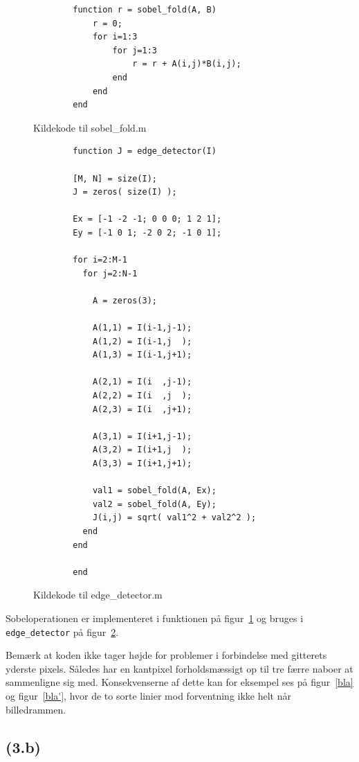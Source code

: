 \documentclass{article}
\begin{document}
\begin{figure}
	\begin{verbatim}
		function r = sobel_fold(A, B)
		    r = 0;
		    for i=1:3
		        for j=1:3
		            r = r + A(i,j)*B(i,j);
		        end
		    end
		end
	\end{verbatim}
	\caption{Kildekode til sobel\_fold.m}
	\label{sobelfold}
\end{figure}

\begin{figure}
	\begin{verbatim}
		function J = edge_detector(I)

		[M, N] = size(I);
		J = zeros( size(I) );

		Ex = [-1 -2 -1; 0 0 0; 1 2 1];
		Ey = [-1 0 1; -2 0 2; -1 0 1];

		for i=2:M-1
		  for j=2:N-1

		    A = zeros(3);

		    A(1,1) = I(i-1,j-1);
		    A(1,2) = I(i-1,j  );
		    A(1,3) = I(i-1,j+1);

		    A(2,1) = I(i  ,j-1);
		    A(2,2) = I(i  ,j  );
		    A(2,3) = I(i  ,j+1);

		    A(3,1) = I(i+1,j-1);
		    A(3,2) = I(i+1,j  );
		    A(3,3) = I(i+1,j+1);

		    val1 = sobel_fold(A, Ex);
		    val2 = sobel_fold(A, Ey);
		    J(i,j) = sqrt( val1^2 + val2^2 );
		  end
		end

		end
	\end{verbatim}
	\caption{Kildekode til edge\_detector.m}
	\label{edgedetector}
\end{figure}

Sobeloperationen er implementeret i funktionen på figur~\ref{sobelfold} og bruges i {\tt edge\_detector} på figur~\ref{edgedetector}.

Bemærk at koden ikke tager højde for problemer i forbindelse med gitterets yderste pixels. Således har en kantpixel forholdsmæssigt op til tre færre naboer at sammenligne sig med. Konsekvenserne af dette kan for eksempel ses på figur~\ref{bla} og figur~\ref{bla'}, hvor de to sorte linier mod forventning ikke helt når billedrammen.

\subsection*{(3.b)}
\end{document}
